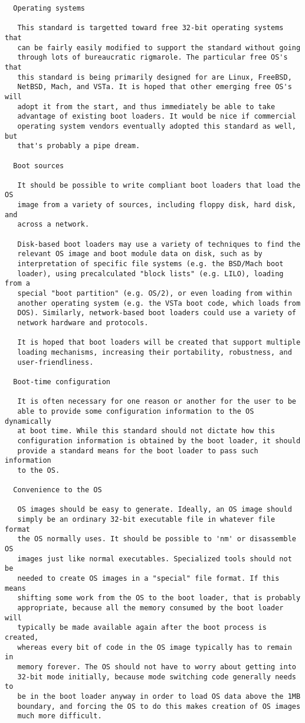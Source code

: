 \begin{verbatim}
  Operating systems
  
   This standard is targetted toward free 32-bit operating systems that
   can be fairly easily modified to support the standard without going
   through lots of bureaucratic rigmarole. The particular free OS's that
   this standard is being primarily designed for are Linux, FreeBSD,
   NetBSD, Mach, and VSTa. It is hoped that other emerging free OS's will
   adopt it from the start, and thus immediately be able to take
   advantage of existing boot loaders. It would be nice if commercial
   operating system vendors eventually adopted this standard as well, but
   that's probably a pipe dream.
   
  Boot sources
  
   It should be possible to write compliant boot loaders that load the OS
   image from a variety of sources, including floppy disk, hard disk, and
   across a network.
   
   Disk-based boot loaders may use a variety of techniques to find the
   relevant OS image and boot module data on disk, such as by
   interpretation of specific file systems (e.g. the BSD/Mach boot
   loader), using precalculated "block lists" (e.g. LILO), loading from a
   special "boot partition" (e.g. OS/2), or even loading from within
   another operating system (e.g. the VSTa boot code, which loads from
   DOS). Similarly, network-based boot loaders could use a variety of
   network hardware and protocols.
   
   It is hoped that boot loaders will be created that support multiple
   loading mechanisms, increasing their portability, robustness, and
   user-friendliness.
   
  Boot-time configuration
  
   It is often necessary for one reason or another for the user to be
   able to provide some configuration information to the OS dynamically
   at boot time. While this standard should not dictate how this
   configuration information is obtained by the boot loader, it should
   provide a standard means for the boot loader to pass such information
   to the OS.
   
  Convenience to the OS
  
   OS images should be easy to generate. Ideally, an OS image should
   simply be an ordinary 32-bit executable file in whatever file format
   the OS normally uses. It should be possible to 'nm' or disassemble OS
   images just like normal executables. Specialized tools should not be
   needed to create OS images in a "special" file format. If this means
   shifting some work from the OS to the boot loader, that is probably
   appropriate, because all the memory consumed by the boot loader will
   typically be made available again after the boot process is created,
   whereas every bit of code in the OS image typically has to remain in
   memory forever. The OS should not have to worry about getting into
   32-bit mode initially, because mode switching code generally needs to
   be in the boot loader anyway in order to load OS data above the 1MB
   boundary, and forcing the OS to do this makes creation of OS images
   much more difficult.
   

\end{verbatim}
